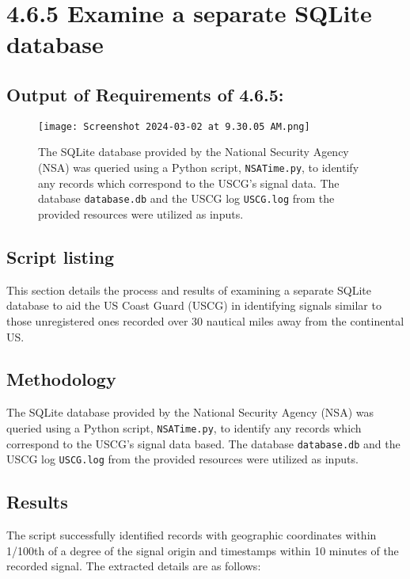 \documentclass{article}
\begin{document}
\section*{4.6.5 Examine a separate SQLite database}

\subsection*{Output of Requirements of 4.6.5:}
\begin{figure}[H]
    \centering
    \texttt{[image: Screenshot 2024-03-02 at 9.30.05 AM.png]}
    \caption{The SQLite database provided by the National Security Agency (NSA) was queried using a Python script, \texttt{NSATime.py}, to identify any records which correspond to the USCG's signal data. The database \texttt{database.db} and the USCG log \texttt{USCG.log} from the provided resources were utilized as inputs.}
\end{figure}

\subsection*{Script listing}



This section details the process and results of examining a separate SQLite database to aid the US Coast Guard (USCG) in identifying signals similar to those unregistered ones recorded over 30 nautical miles away from the continental US.

\subsection*{Methodology}
The SQLite database provided by the National Security Agency (NSA) was queried using a Python script, \texttt{NSATime.py}, to identify any records which correspond to the USCG's signal data based. The database \texttt{database.db} and the USCG log \texttt{USCG.log}  from the provided resources were utilized as inputs.

\subsection*{Results}
The script successfully identified records with geographic coordinates within 1/100th of a degree of the signal origin and timestamps within 10 minutes of the recorded signal. The extracted details are as follows:
\end{document}

